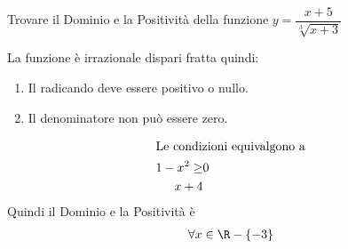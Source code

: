 	Trovare il Dominio e la Positività della funzione $y=\dfrac{x+5}{\sqrt[3]{x+3}}$%
	
	La funzione è irrazionale dispari fratta quindi:
	\begin{enumerate}
	\item Il radicando deve essere positivo o nullo.
	\item Il denominatore non può essere zero.
\end{enumerate}
	\begin{align*}
	\intertext{Le condizioni equivalgono a}
1-x^2\geq&0\\
x+4
	\end{align*}
	Quindi il Dominio e la Positività è
\begin{align*}
\forall x\in\R-\lbrace-3&\rbrace\\
\end{align*}
	
